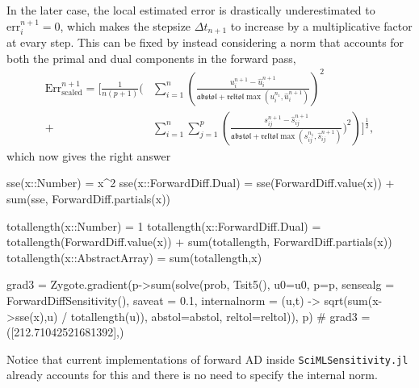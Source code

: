 In the later case, the local estimated error is drastically underestimated to $\text{err}_i^{n+1} = 0$, which makes the stepsize $\Delta t_{n+1}$ to increase by a multiplicative factor at evary step. 
This can be fixed by instead considering a norm that accounts for both the primal and dual components in the forward pass, 
\begin{align}
    \text{Err}_\text{scaled}^{n+1}
    =
    \Bigg[ \frac{1}{n(p+1)} \Bigg( 
    &\sum_{i=1}^n \left( \frac{u_i^{n+1} - \hat u_i^{n+1}}{\mathfrak{abstol} + \mathfrak{reltol} \max (u_i^{n_1}, \hat u_i^{n+1})} \right)^2 \nonumber \\
    + 
    &\sum_{i=1}^n \sum_{j=1}^p  
    \left( \frac{s_{ij}^{n+1} - \hat s_{ij}^{n+1}}{\mathfrak{abstol} + \mathfrak{reltol} \max (s_{ij}^{n_1}, \hat s_{ij}^{n+1})} \Bigg)^2 \right)
    \Bigg]^{\frac{1}{2}},
    \label{eq:internal-norm-correct} 
\end{align}
which now gives the right answer
\begin{jllisting}
sse(x::Number) = x^2
sse(x::ForwardDiff.Dual) = sse(ForwardDiff.value(x)) + sum(sse, ForwardDiff.partials(x))

totallength(x::Number) = 1
totallength(x::ForwardDiff.Dual) = totallength(ForwardDiff.value(x)) + sum(totallength, ForwardDiff.partials(x))
totallength(x::AbstractArray) = sum(totallength,x)

grad3 = Zygote.gradient(p->sum(solve(prob, Tsit5(), u0=u0, p=p, sensealg = ForwardDiffSensitivity(), saveat = 0.1, internalnorm = (u,t) -> sqrt(sum(x->sse(x),u) / totallength(u)), abstol=abstol, reltol=reltol)), p)
# grad3 = ([212.71042521681392],)
\end{jllisting}
Notice that current implementations of forward AD inside \texttt{SciMLSensitivity.jl} already accounts for this and there is no need to specify the internal norm. 